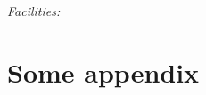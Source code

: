 \documentclass[12pt,preprint]{aastex}
\newcommand{\figlabel}[1]{\label{fig:#1}}
\begin{document}
{\it Facilities:} 

\appendix

\section{Some appendix}

\clearpage

\clearpage


\end{document}
